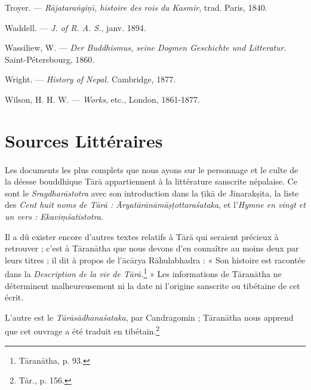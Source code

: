 \documentclass[a4paper, 11pt, oneside, french]{article}
\begin{document}
Troyer. --- \emph{R\={a}jatara\.{n}gi\d{n}\={\i}, histoire des rois du Kasmir}, trad. Paris, 1840.

Waddell. --- \emph{J. of R. A. S.}, janv. 1894.

Wassiliew, W. --- \emph{Der Buddhismus, seine Dogmen Geschichte und Litteratur.} Saint-Pétersbourg, 1860.

Wright. --- \emph{History of Nepal.} Cambridge, 1877.

Wilson, H. H. W. --- \emph{Works}, etc., London, 1861-1877.
\clearpage
\normalsize
\section{Sources Littéraires}
\paragraph{}
Les documents les plus complets que nous ayons sur le personnage et le culte de la déesse bouddhique T\={a}r\={a} appartiennent à la littérature sanscrite népalaise. Ce sont le \emph{Sragdhar\={a}stotra} avec son introduction dans la \d{t}\={\i}k\={a} de Jinarak\d{s}ita, la liste des \emph{Cent huit noms de T\={a}r\={a} : \={A}ryat\={a}r\={a}n\={a}m\={a}\d{s}\d{t}ottara\'{s}ataka}, et l'\emph{Hymne en vingt et un vers : Ekavi\d{m}\'{s}atistotra}.

Il a dû exister encore d'autres textes relatifs à T\={a}r\={a} qui seraient précieux à retrouver ; c'est à T\={a}ran\={a}tha que nous devons d'en connaître au moins deux par leurs titres ; il dit à propos de l'\={a}c\={a}rya R\={a}hulabhadra : « Son histoire est racontée dans la \emph{Description de la vie de T\={a}r\={a}.}\footnote{T\={a}ran\={a}tha, p. 93.} » Les informations de T\={a}ran\={a}tha ne déterminent malheureusement ni la date ni l'origine sanscrite ou tibétaine de cet écrit.

L'autre est le \emph{T\={a}r\={a}s\={a}dhana\'{s}ataka}, par Candragomin ; T\={a}ran\={a}tha nous apprend que cet ouvrage a été traduit en tibétain.\footnote{T\={a}r., p. 156.}
\end{document}
